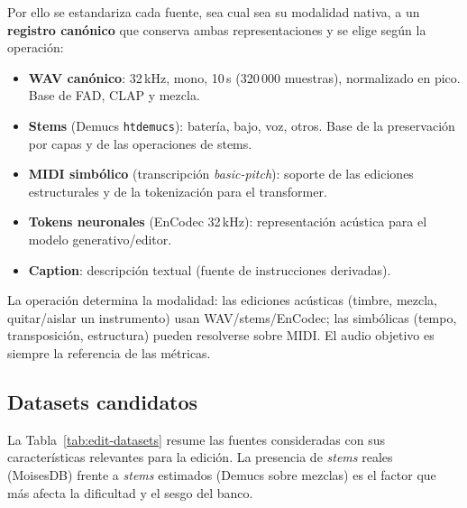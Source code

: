 Por ello se estandariza cada fuente, sea cual sea su modalidad nativa, a un
\textbf{registro canónico} que conserva ambas representaciones y se elige según
la operación:
\begin{itemize}
  \item \textbf{WAV canónico}: 32\,kHz, mono, 10\,s (320\,000 muestras),
        normalizado en pico. Base de FAD, CLAP y mezcla.
  \item \textbf{Stems} (Demucs \texttt{htdemucs}): batería, bajo, voz, otros.
        Base de la preservación por capas y de las operaciones de stems.
  \item \textbf{MIDI simbólico} (transcripción \textit{basic-pitch}): soporte de
        las ediciones estructurales y de la tokenización para el transformer.
  \item \textbf{Tokens neuronales} (EnCodec 32\,kHz): representación acústica
        para el modelo generativo/editor.
  \item \textbf{Caption}: descripción textual (fuente de instrucciones derivadas).
\end{itemize}
La operación determina la modalidad: las ediciones acústicas (timbre, mezcla,
quitar/aislar un instrumento) usan WAV/stems/EnCodec; las simbólicas
(tempo, transposición, estructura) pueden resolverse sobre MIDI. El audio
objetivo es siempre la referencia de las métricas.

\subsection{Datasets candidatos}
\label{sec:edit:data:datasets}

La Tabla~\ref{tab:edit-datasets} resume las fuentes consideradas con sus
características relevantes para la edición. La presencia de \textit{stems} reales
(MoisesDB) frente a \textit{stems} estimados (Demucs sobre mezclas) es el factor
que más afecta la dificultad y el sesgo del banco.

